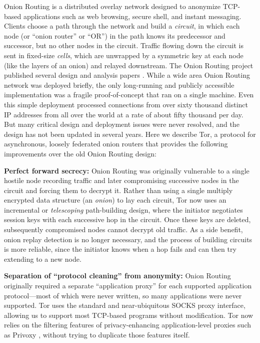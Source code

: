 \documentclass[times,10pt,twocolumn]{article}
\begin{document}
Onion Routing is a distributed overlay network designed to anonymize
TCP-based applications such as web browsing, secure shell,
and instant messaging. Clients choose a path through the network and
build a \emph{circuit}, in which each node (or ``onion router'' or ``OR'')
in the path knows its predecessor and successor, but no other nodes in
the circuit.  Traffic flowing down the circuit is sent in fixed-size
\emph{cells}, which are unwrapped by a symmetric key at each node
(like the layers of an onion) and relayed downstream. The
Onion Routing project published several design and analysis papers
\cite{or-ih96,or-jsac98,or-discex00,or-pet00}. While a wide area Onion
Routing network was deployed briefly, the only long-running and
publicly accessible implementation was a fragile
proof-of-concept that ran on a single machine. Even this simple deployment
processed connections from over sixty thousand distinct IP addresses from
all over the world at a rate of about fifty thousand per day.
But many critical design and deployment issues were never
resolved, and the design has not been updated in several years. Here
we describe Tor, a protocol for asynchronous, loosely federated onion
routers that provides the following improvements over the old Onion
Routing design:

\textbf{Perfect forward secrecy:} Onion Routing
was originally vulnerable to a single hostile node recording traffic and
later compromising successive nodes in the circuit and forcing them
to decrypt it. Rather than using a single multiply encrypted data
structure (an \emph{onion}) to lay each circuit,
Tor now uses an incremental or \emph{telescoping} path-building design,
where the initiator negotiates session keys with each successive hop in
the circuit.  Once these keys are deleted, subsequently compromised nodes
cannot decrypt old traffic.  As a side benefit, onion replay detection
is no longer necessary, and the process of building circuits is more
reliable, since the initiator knows when a hop fails and can then try
extending to a new node.

\textbf{Separation of ``protocol cleaning'' from anonymity:}
Onion Routing originally required a separate ``application
proxy'' for each supported application protocol---most of which were
never written, so many applications were never supported.  Tor uses the
standard and near-ubiquitous SOCKS \cite{socks4} proxy interface, allowing
us to support most TCP-based programs without modification.  Tor now
relies on the filtering features of privacy-enhancing
application-level proxies such as Privoxy \cite{privoxy}, without trying
to duplicate those features itself.
\end{document}

